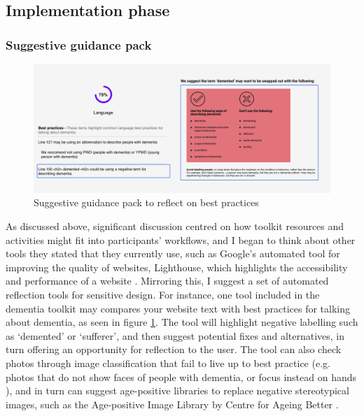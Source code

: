 \subsection{Implementation phase}
\subsubsection{Suggestive guidance pack}
\begin{figure}[h]
\centering
\includegraphics[width=1\linewidth]{Images/D3Toolkit/Fig10.png}
\caption{Suggestive guidance pack to reflect on best practices}
\label{fig:suggestPack}
\end{figure}
As discussed above, significant discussion centred on how toolkit resources and activities might fit into participants’ workflows, and I began to think about other tools they stated that they currently use, such as Google’s automated tool for improving the quality of websites, Lighthouse, which highlights the accessibility and performance of a website \citep{chrome_lighthouse_2021}. Mirroring this, I suggest a set of automated reflection tools for sensitive design. For instance, one tool included in the dementia toolkit may compares your website text with best practices for talking about dementia, as seen in figure \ref{fig:suggestPack}. The tool will highlight negative labelling such as `demented' or `sufferer', and then suggest potential fixes and alternatives, in turn offering an opportunity for reflection to the user. The tool can also check photos through image classification that fail to live up to best practice (e.g. photos that do not show faces of people with dementia, or focus instead on hands \citep{low2020negative}), and in turn can suggest age-positive libraries to replace negative stereotypical images, such as the Age-positive Image Library by Centre for Ageing Better \citep{noauthor_age-positive_nodate}.

